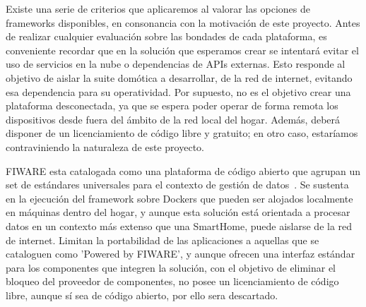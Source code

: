 Existe una serie de criterios que aplicaremos al valorar las opciones de frameworks disponibles, en consonancia con la motivación de este proyecto. Antes de realizar cualquier evaluación sobre las bondades de cada plataforma, es conveniente recordar que en la solución que esperamos crear se intentará evitar el uso de servicios en la nube o dependencias de APIs externas. Esto responde al objetivo de aislar la suite domótica a desarrollar, de la red de internet, evitando esa dependencia para su operatividad. Por supuesto, no es el objetivo crear una plataforma desconectada, ya que se espera poder operar de forma remota los dispositivos desde fuera del ámbito de la red local del hogar. Además, deberá disponer de un licenciamiento de código libre y gratuito; en otro caso, estaríamos contraviniendo la naturaleza de este proyecto.

\vspace{1.5cm}

FIWARE esta catalogada como una plataforma de código abierto que agrupan un set de estándares universales para el contexto de gestión de datos~\cite{whatisfiware}. Se sustenta en la ejecución del framework sobre Dockers que pueden ser alojados localmente en máquinas dentro del hogar, y aunque esta solución está orientada a procesar datos en un contexto más extenso que una SmartHome, puede aislarse de la red de internet. Limitan la portabilidad de las aplicaciones a aquellas que se cataloguen como 'Powered by FIWARE', y aunque ofrecen una interfaz estándar para los componentes que integren la solución, con el objetivo de eliminar el bloqueo del proveedor de componentes, no posee un licenciamiento de código libre, aunque sí sea de código abierto, por ello sera descartado.

\vspace{1.5cm}

